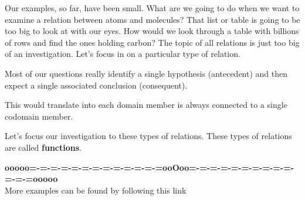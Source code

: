 \documentclass{ximera}
\begin{document}
Our examples, so far, have been small.  What are we going to do when we want to examine a relation between atoms and molecules?  That list or table is going to be too big to look at with our eyes.  How would we look through a table with billions of rows and find the ones holding carbon?  The topic of all relations is just too big of an investigation. Let's focus in on a particular type of relation.

Most of our questions really identify a single hypothesis (antecedent) and then expect a single associated conclusion (consequent).

This would translate into each domain member is always connected to a single codomain member.

Let's focus our investigation to these types of relations.  These types of relations are called \textbf{\textcolor{purple!85!blue}{functions}}.














\begin{center}
\textbf{\textcolor{green!50!black}{ooooo=-=-=-=-=-=-=-=-=-=-=-=-=ooOoo=-=-=-=-=-=-=-=-=-=-=-=-=ooooo}} \\

More examples can be found by following this link\\ 

\end{center}
\end{document}
